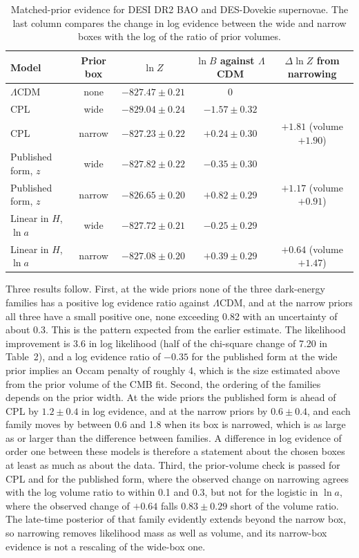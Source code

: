 \documentclass[11pt]{article}
\begin{document}
\begin{table}[h]
\centering\small
\begin{tabular}{lcccc}
\toprule
Model & Prior box & $\ln Z$ & $\ln B$ against $\Lambda$CDM & $\Delta\ln Z$ from narrowing\\
\midrule
$\Lambda$CDM & none & $-827.47\pm0.21$ & 0 & \\
CPL & wide & $-829.04\pm0.24$ & $-1.57\pm0.32$ & \\
CPL & narrow & $-827.23\pm0.22$ & $+0.24\pm0.30$ & $+1.81$ (volume $+1.90$)\\
Published form, $z$ & wide & $-827.82\pm0.22$ & $-0.35\pm0.30$ & \\
Published form, $z$ & narrow & $-826.65\pm0.20$ & $+0.82\pm0.29$ & $+1.17$ (volume $+0.91$)\\
Linear in $H$, $\ln a$ & wide & $-827.72\pm0.21$ & $-0.25\pm0.29$ & \\
Linear in $H$, $\ln a$ & narrow & $-827.08\pm0.20$ & $+0.39\pm0.29$ & $+0.64$ (volume $+1.47$)\\
\bottomrule
\end{tabular}
\caption{Matched-prior evidence for DESI DR2 BAO and DES-Dovekie supernovae. The last column compares the change in log evidence between the wide and narrow boxes with the log of the ratio of prior volumes.}
\end{table}

Three results follow. First, at the wide priors none of the three dark-energy families has a positive log evidence ratio against $\Lambda$CDM, and at the narrow priors all three have a small positive one, none exceeding 0.82 with an uncertainty of about 0.3. This is the pattern expected from the earlier estimate. The likelihood improvement is 3.6 in log likelihood (half of the chi-square change of 7.20 in Table~2), and a log evidence ratio of $-0.35$ for the published form at the wide prior implies an Occam penalty of roughly 4, which is the size estimated above from the prior volume of the CMB fit. Second, the ordering of the families depends on the prior width. At the wide priors the published form is ahead of CPL by $1.2\pm0.4$ in log evidence, and at the narrow priors by $0.6\pm0.4$, and each family moves by between 0.6 and 1.8 when its box is narrowed, which is as large as or larger than the difference between families. A difference in log evidence of order one between these models is therefore a statement about the chosen boxes at least as much as about the data. Third, the prior-volume check is passed for CPL and for the published form, where the observed change on narrowing agrees with the log volume ratio to within 0.1 and 0.3, but not for the logistic in $\ln a$, where the observed change of $+0.64$ falls $0.83\pm0.29$ short of the volume ratio. The late-time posterior of that family evidently extends beyond the narrow box, so narrowing removes likelihood mass as well as volume, and its narrow-box evidence is not a rescaling of the wide-box one.
\end{document}
